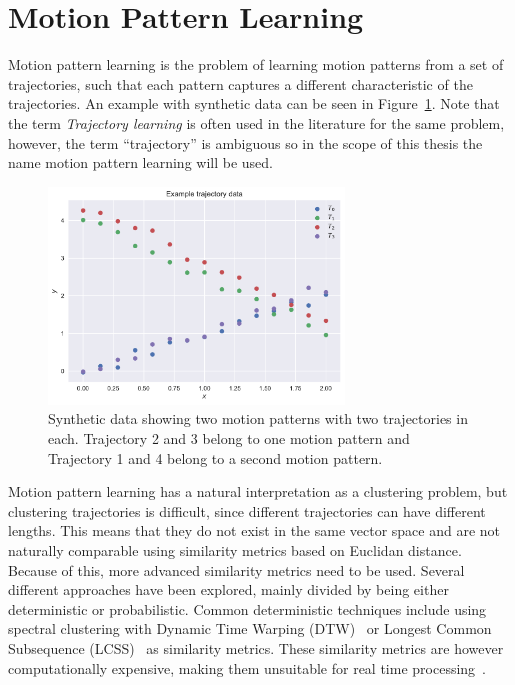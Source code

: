 \section{Motion Pattern Learning}
Motion pattern learning is the problem of learning motion patterns from a
set of trajectories, such that each pattern captures a different
characteristic of the trajectories. An example with synthetic data can be
seen in Figure~\ref{fig:motion-pattern-example}. Note that the term
\textit{Trajectory learning} is often used in the literature for the
same problem, however, the term ``trajectory'' is ambiguous so in the
scope of this thesis the name motion pattern learning will be used. 
\begin{figure}[H]
  \centering
  \includegraphics[width=0.7\textwidth]{figures/motion-pattern-example}
  \caption{Synthetic data showing two motion patterns with two trajectories in
    each. Trajectory 2 and 3 belong to one motion pattern and
    Trajectory 1 and 4 belong to a second motion pattern.}\label{fig:motion-pattern-example}
\end{figure}
Motion pattern learning has a natural interpretation as a
clustering problem, but clustering trajectories is difficult,
since different trajectories can have different lengths.
This means that they do not exist in the same vector space and are not
naturally comparable using similarity metrics based on Euclidan
distance. Because of this, more
advanced similarity metrics need to be used. Several different
approaches have been explored, mainly divided by being either deterministic
or probabilistic. Common deterministic techniques
include using spectral clustering with Dynamic Time Warping
(DTW)~\cite{Tang2018Aug} or Longest
Common Subsequence (LCSS)~\cite{Vlachos2002Feb} as similarity metrics.
These similarity metrics are however computationally expensive, making them unsuitable for
real time processing~\cite{Zhang2006Aug}.

